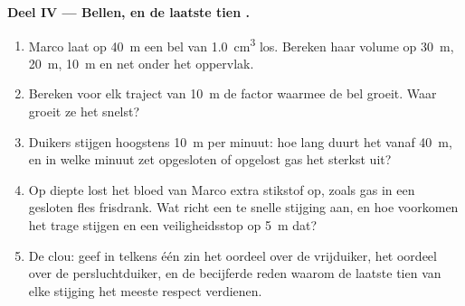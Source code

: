 \begin{problem}
\medskip
\noindent\textbf{Deel IV --- Bellen, en de laatste tien .}
\begin{enumerate}[resume]
  \item Marco laat op \qty{40}{m} een bel van \qty{1.0}{cm^3} los.
        Bereken haar volume op \qty{30}{m}, \qty{20}{m}, \qty{10}{m} en
        net onder het oppervlak.
  \item Bereken voor elk traject van \qty{10}{m} de factor waarmee de
        bel groeit. Waar groeit ze het snelst?
  \item Duikers stijgen hoogstens \qty{10}{m} per minuut: hoe lang duurt
        het vanaf \qty{40}{m}, en in welke minuut zet opgesloten of
        opgelost gas het sterkst uit?
  \item Op diepte lost het bloed van Marco extra stikstof op, zoals gas
        in een gesloten fles frisdrank. Wat richt een te snelle stijging
        aan, en hoe voorkomen het trage stijgen en een veiligheidsstop
        op \qty{5}{m} dat?
  \item De clou: geef in telkens één zin het oordeel over de vrijduiker,
        het oordeel over de persluchtduiker, en de becijferde reden
        waarom de laatste tien  van elke stijging het meeste
        respect verdienen.
\end{enumerate}
\end{problem}
